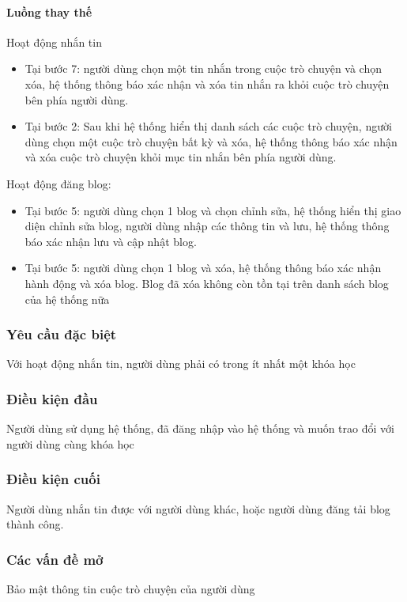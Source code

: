 \documentclass[./../main_file.tex]{subfiles}
\begin{document}
\paragraph{Luồng thay thế}
	Hoạt động nhắn tin
\begin{itemize}
	\item Tại bước 7: người dùng chọn một tin nhắn trong cuộc trò chuyện và chọn xóa, hệ thống thông báo xác nhận và xóa tin nhắn ra khỏi cuộc trò chuyện bên phía người dùng.
	\item Tại bước 2: Sau khi hệ thống hiển thị danh sách các cuộc trò chuyện, người dùng chọn một cuộc trò chuyện bất kỳ và xóa, hệ thống thông báo xác nhận và xóa cuộc trò chuyện khỏi mục tin nhắn bên phía người dùng.
\end{itemize}
	Hoạt động đăng blog:
\begin{itemize}
	\item Tại bước 5: người dùng chọn 1 blog và chọn chỉnh sửa, hệ thống hiển thị giao diện chỉnh sửa blog, người dùng nhập các thông tin và lưu, hệ thống thông báo xác nhận lưu và cập nhật blog.
	\item Tại bước 5: người dùng chọn 1 blog và xóa, hệ thống thông báo xác nhận hành động và xóa blog. Blog đã xóa không còn tồn tại trên danh sách blog của hệ thống nữa
	
\end{itemize}
\subsubsection{Yêu cầu đặc biệt}
Với hoạt động nhắn tin, người dùng phải có trong ít nhất một khóa học

\subsubsection{Điều kiện đầu}
Người dùng sử dụng hệ thống, đã đăng nhập vào hệ thống và muốn trao đổi với người dùng cùng khóa học

\subsubsection{Điều kiện cuối}
Người dùng nhắn tin được với người dùng khác,  hoặc người dùng đăng tải blog thành công.

\subsubsection{Các vấn đề mở}
Bảo mật thông tin cuộc trò chuyện của người dùng
\end{document}
